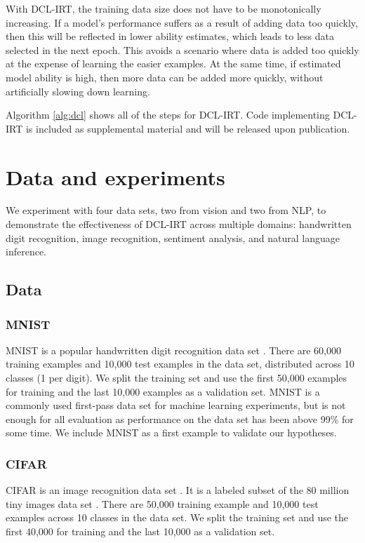 \documentclass[letterpaper]{article} %
\begin{document}
With DCL-IRT, the training data size does not have to be monotonically increasing. If a model's performance suffers as a result of adding data too quickly, then this will be reflected in lower ability estimates, which leads to less data selected in the next epoch. 
This avoids a scenario where data is added too quickly at the expense of learning the easier examples.
At the same time, if estimated model ability is high, then more data can be added more quickly, without artificially slowing down learning.

Algorithm \ref{alg:dcl} shows all of the steps for DCL-IRT. Code implementing DCL-IRT is included as supplemental material and will be released upon publication. 

\section{Data and experiments} 

We experiment with four data sets, two from vision and two from NLP, to demonstrate the effectiveness of DCL-IRT across multiple domains: handwritten digit recognition, image recognition, sentiment analysis, and natural language inference.

\subsection{Data}
\subsubsection{MNIST}

MNIST is a popular handwritten digit recognition data set \cite{lecun_mnist_1998}.
There are 60,000 training examples and 10,000 test examples in the data set, distributed across 10 classes (1 per digit).
We split the training set and use the first 50,000 examples for training and the last 10,000 examples as a validation set.
MNIST is a commonly used first-pass data set for machine learning experiments, but is not enough for all evaluation as performance on the data set has been above 99\% for some time.
We include MNIST as a first example to validate our hypotheses.

\subsubsection{CIFAR} 

CIFAR is an image recognition data set \cite{krizhevsky_learning_2009}.
It is a labeled subset of the 80 million tiny images data set \cite{torralba_80_2008}.
There are 50,000 training example and 10,000 test examples across 10 classes in the data set.
We split the training set and use the first 40,000 for training and the last 10,000 as a validation set. 
\end{document}
